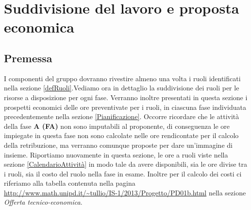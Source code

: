 \newcommand{\tableResource}{
		\begin{center}
		\begin{tabular}{|p{3.5cm}|c|c|c|c|c|c|c|}
			\hline
			\textbf{Nominativi} &
			\textbf{Ad} &
			\textbf{Re} &
			\textbf{An} &
			\textbf{Ve} &
			\textbf{Pj} &
			\textbf{Pr} &
			\textbf{Totali}\\
			\hline
		}
\newcommand{\tableResourceTwo}{
		\begin{center}
		\begin{tabular}{|p{4cm}|c|c|c|c|c|c|c|}
			\hline
			\textbf{Nominativi} &
			\textbf{Ad} &
			\textbf{Re} &
			\textbf{An} &
			\textbf{Ve} &
			\textbf{Pj} &
			\textbf{Pr} &
			\textbf{Ore Totali} &
			\textbf{Ore Rendicontate}\\
			\hline
		}
\newcommand{\tableEco}{
		\begin{center}
		\begin{tabular}{|l|c|r|}
			\hline
			\textbf{Ruolo} &
			\textbf{Ore} &
			\textbf{Costo}\\
			\hline
}
\section{Suddivisione del lavoro e proposta economica}
\label{lavoroEconomico}
\subsection{Premessa}
I componenti del gruppo \authorName{} dovranno rivestire almeno una volta i ruoli identificati nella sezione \ref{defRuoli}.Vediamo ora in dettaglio la suddivisione dei ruoli per le risorse a disposizione per ogni fase. Verranno inoltre presentati in questa sezione i prospetti economici delle ore preventivate per i ruoli, in ciascuna fase individuata precedentemente nella sezione \ref{Pianificazione}.
Occorre ricordare che le attività della fase \textbf{A (FA)} non sono imputabili al proponente, di conseguenza le ore impiegate in questa fase non sono calcolate nelle ore rendicontate per il calcolo della retribuzione, ma verranno comunque proposte per dare un'immagine di insieme. Riportiamo nuovamente in questa sezione, le ore a ruoli viste nella sezione \ref{CalendarioAttività} in modo tale da avere disponibili, sia le ore divise tra i ruoli, sia il costo del ruolo nella fase in esame. Inoltre per il calcolo dei costi ci riferiamo alla tabella contenuta nella pagina \url{http://www.math.unipd.it/~tullio/IS-1/2013/Progetto/PD01b.html} nella sezione \emph{Offerta tecnico-economica}.
\pagebreak
